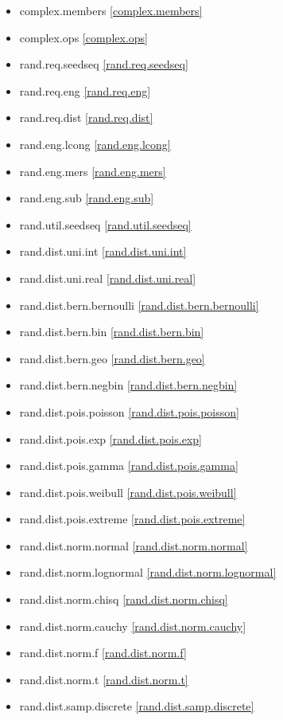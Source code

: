 \begin{multicols}{3}
\begin{itemize}
\item{complex.members}			\ref{complex.members}
\item{complex.ops}				\ref{complex.ops}
\item{rand.req.seedseq}			\ref{rand.req.seedseq}
\item{rand.req.eng}				\ref{rand.req.eng}
\item{rand.req.dist}			\ref{rand.req.dist}
\item{rand.eng.lcong}			\ref{rand.eng.lcong}
\item{rand.eng.mers}			\ref{rand.eng.mers}
\item{rand.eng.sub}				\ref{rand.eng.sub}
\item{rand.util.seedseq}		\ref{rand.util.seedseq}
\item{rand.dist.uni.int}		\ref{rand.dist.uni.int}
\item{rand.dist.uni.real}		\ref{rand.dist.uni.real}
\item{rand.dist.bern.bernoulli}	\ref{rand.dist.bern.bernoulli}
\item{rand.dist.bern.bin}		\ref{rand.dist.bern.bin}
\item{rand.dist.bern.geo}		\ref{rand.dist.bern.geo}
\item{rand.dist.bern.negbin}	\ref{rand.dist.bern.negbin}
\item{rand.dist.pois.poisson}	\ref{rand.dist.pois.poisson}
\item{rand.dist.pois.exp}		\ref{rand.dist.pois.exp}
\item{rand.dist.pois.gamma}		\ref{rand.dist.pois.gamma}
\item{rand.dist.pois.weibull}	\ref{rand.dist.pois.weibull}
\item{rand.dist.pois.extreme}	\ref{rand.dist.pois.extreme}
\item{rand.dist.norm.normal}	\ref{rand.dist.norm.normal}
\item{rand.dist.norm.lognormal}	\ref{rand.dist.norm.lognormal}
\item{rand.dist.norm.chisq}		\ref{rand.dist.norm.chisq}
\item{rand.dist.norm.cauchy}	\ref{rand.dist.norm.cauchy}
\item{rand.dist.norm.f}			\ref{rand.dist.norm.f}
\item{rand.dist.norm.t}			\ref{rand.dist.norm.t}
\item{rand.dist.samp.discrete}	\ref{rand.dist.samp.discrete}

\end{itemize}
\end{multicols}

